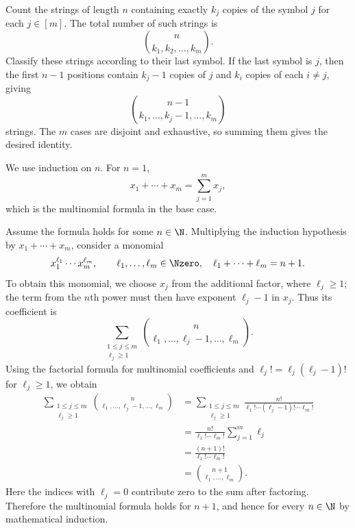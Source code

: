 \documentclass[11pt,oneside]{article}
\begin{document}
\begin{solution}
\begin{problemsubparts}
    \item Count the strings of length $n$ containing exactly $k_j$ copies of the symbol $j$ for each $j\in[m]$. The total number of such strings is
    \[
        \binom{n}{k_1,k_2,\ldots,k_m}.
    \]
    Classify these strings according to their last symbol. If the last symbol is $j$, then the first $n-1$ positions contain $k_j-1$ copies of $j$ and $k_i$ copies of each $i\neq j$, giving
    \[
        \binom{n-1}{k_1,\ldots,k_j-1,\ldots,k_m}
    \]
    strings. The $m$ cases are disjoint and exhaustive, so summing them gives the desired identity.

    \item We use induction on $n$. For $n=1$,
    \[
        x_1+\cdots+x_m
        =\sum_{j=1}^{m}x_j,
    \]
    which is the multinomial formula in the base case.

    Assume the formula holds for some $n\in\N$. Multiplying the induction hypothesis by $x_1+\cdots+x_m$, consider a monomial
    \[
        x_1^{\ell_1}\cdots x_m^{\ell_m},
        \qquad
        \ell_1,\ldots,\ell_m\in\Nzero,
        \quad
        \ell_1+\cdots+\ell_m=n+1.
    \]
    To obtain this monomial, we choose $x_j$ from the additional factor, where $\ell_j\geq1$; the term from the $n$th power must then have exponent $\ell_j-1$ in $x_j$. Thus its coefficient is
    \[
        \sum_{\substack{1\leq j\leq m\\\ell_j\geq1}}
        \binom{n}{\ell_1,\ldots,\ell_j-1,\ldots,\ell_m}.
    \]
    Using the factorial formula for multinomial coefficients and
    $\ell_j!=\ell_j(\ell_j-1)!$ for $\ell_j\geq1$, we obtain
    \[
    \begin{aligned}
        \sum_{\substack{1\leq j\leq m\\\ell_j\geq1}}
        \binom{n}{\ell_1,\ldots,\ell_j-1,\ldots,\ell_m}
        &=\sum_{\substack{1\leq j\leq m\\\ell_j\geq1}}
          \frac{n!}{\ell_1!\cdots(\ell_j-1)!\cdots\ell_m!}\\
        &=\frac{n!}{\ell_1!\cdots\ell_m!}
          \sum_{j=1}^{m}\ell_j\\
        &=\frac{(n+1)!}{\ell_1!\cdots\ell_m!}\\
        &=\binom{n+1}{\ell_1,\ldots,\ell_m}.
    \end{aligned}
    \]
    Here the indices with $\ell_j=0$ contribute zero to the sum after factoring.
    Therefore the multinomial formula holds for $n+1$, and hence for every $n\in\N$ by mathematical induction.
\end{problemsubparts}
\end{solution}
\end{document}
